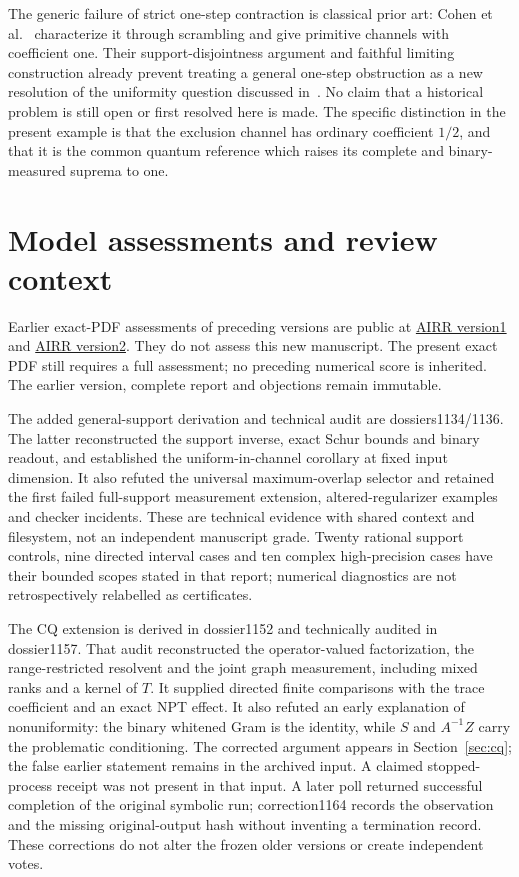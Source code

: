 \documentclass[11pt]{article}
\theoremstyle{remark}\newtheorem{remark}[theorem]{Remark}
\begin{document}
The generic failure of strict one-step contraction is classical prior art: Cohen et al.~\cite[Theorem 4.2 and Remark 4.3]{Cohen} characterize it through scrambling and give primitive channels with coefficient one. Their support-disjointness argument and faithful limiting construction already prevent treating a general one-step obstruction as a new resolution of the uniformity question discussed in~\cite{GR}. No claim that a historical problem is still open or first resolved here is made. The specific distinction in the present example is that the exclusion channel has ordinary coefficient $1/2$, and that it is the common quantum reference which raises its complete and binary-measured suprema to one.

\clearpage
\appendix
\section{Model assessments and review context}
Earlier exact-PDF assessments of preceding versions are public at \href{https://airr.science/papers/ARR-2026-564FZ70CSN83KACD/versions/v1/}{AIRR version1} and \href{https://airr.science/papers/ARR-2026-564FZ70CSN83KACD/versions/v2/}{AIRR version2}. They do not assess this new manuscript. The present exact PDF still requires a full assessment; no preceding numerical score is inherited. The earlier version, complete report and objections remain immutable.

The added general-support derivation and technical audit are dossiers1134/1136. The latter reconstructed the support inverse, exact Schur bounds and binary readout, and established the uniform-in-channel corollary at fixed input dimension. It also refuted the universal maximum-overlap selector and retained the first failed full-support measurement extension, altered-regularizer examples and checker incidents. These are technical evidence with shared context and filesystem, not an independent manuscript grade. Twenty rational support controls, nine directed interval cases and ten complex high-precision cases have their bounded scopes stated in that report; numerical diagnostics are not retrospectively relabelled as certificates.


The CQ extension is derived in dossier1152 and technically audited in dossier1157. That audit reconstructed the operator-valued factorization, the range-restricted resolvent and the joint graph measurement, including mixed ranks and a kernel of $T$. It supplied directed finite comparisons with the trace coefficient and an exact NPT effect. It also refuted an early explanation of nonuniformity: the binary whitened Gram is the identity, while $S$ and $A^{-1}Z$ carry the problematic conditioning. The corrected argument appears in Section~\ref{sec:cq}; the false earlier statement remains in the archived input. A claimed stopped-process receipt was not present in that input. A later poll returned successful completion of the original symbolic run; correction1164 records the observation and the missing original-output hash without inventing a termination record. These corrections do not alter the frozen older versions or create independent votes.
\end{document}
